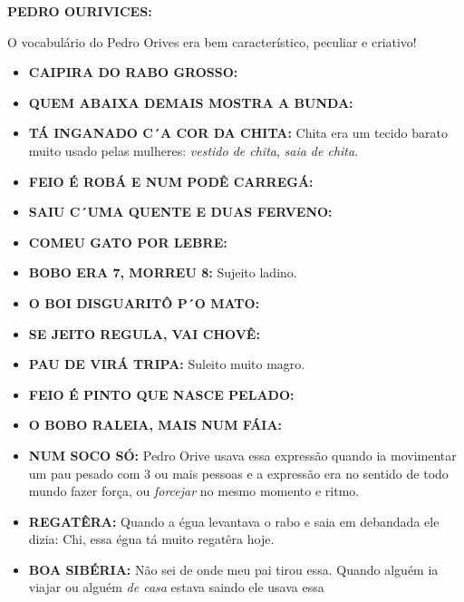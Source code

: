 \documentclass[12pt,brazil,]{book}
\providecommand{\tightlist}{%
  \setlength{\itemsep}{0pt}\setlength{\parskip}{0pt}}
\begin{document}
\textbf{PEDRO OURIVICES:}

O vocabulário do Pedro Orives era bem característico, peculiar e
criativo!

\begin{itemize}
\tightlist
\item
  \textbf{CAIPIRA DO RABO GROSSO:}\\
\item
  \textbf{QUEM ABAIXA DEMAIS MOSTRA A BUNDA:}\\
\item
  \textbf{TÁ INGANADO C´A COR DA CHITA:} Chita era um tecido barato
  muito usado pelas mulheres: \emph{vestido de chita}, \emph{saia de
  chita}.\\
\item
  \textbf{FEIO É ROBÁ E NUM PODÊ CARREGÁ:}\\
\item
  \textbf{SAIU C´UMA QUENTE E DUAS FERVENO:}\\
\item
  \textbf{COMEU GATO POR LEBRE:}\\
\item
  \textbf{BOBO ERA 7, MORREU 8:} Sujeito ladino.\\
\item
  \textbf{O BOI DISGUARITÔ P´O MATO:}\\
\item
  \textbf{SE JEITO REGULA, VAI CHOVÊ:}\\
\item
  \textbf{PAU DE VIRÁ TRIPA:} Suleito muito magro.\\
\item
  \textbf{FEIO É PINTO QUE NASCE PELADO:}\\
\item
  \textbf{O BOBO RALEIA, MAIS NUM FÁIA:}\\
\item
  \textbf{NUM SOCO SÓ:} Pedro Orive usava essa expressão quando ia
  movimentar um pau pesado com 3 ou mais pessoas e a expressão era no
  sentido de todo mundo fazer força, ou \emph{forcejar} no mesmo momento
  e ritmo.\\
\item
  \textbf{REGATÊRA:} Quando a égua levantava o rabo e saia em debandada
  ele dizia: Chi, essa égua tá muito regatêra hoje.\\
\item
  \textbf{BOA SIBÉRIA:} Não sei de onde meu pai tirou essa. Quando
  alguém ia viajar ou alguém \emph{de casa} estava saindo ele usava essa

\end{itemize}
\end{document}
